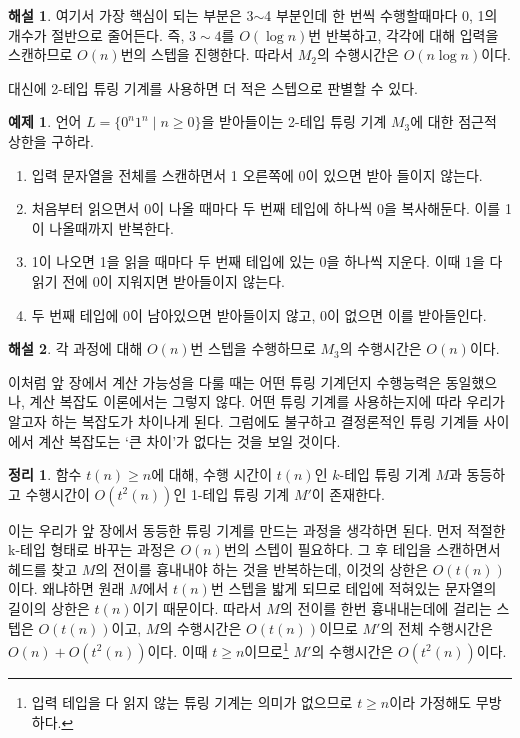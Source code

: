 \documentclass[b5paper, 11pt]{book}
\theoremstyle{definition}
\newtheorem{thm}[defn]{정리}
\newtheorem{ex}[defn]{예제}
\newtheorem*{ans*}{해설}
\newenvironment{pf*}{\pushQED{\qed}\pf}
{\popQED\endpf}
\begin{document}
\begin{ans*}
여기서 가장 핵심이 되는 부분은 3$\sim$4 부분인데 한 번씩 수행할때마다 0, 1의 개수가 절반으로 줄어든다. 즉, $3\sim 4$를 $O(\log{n})$번 반복하고, 각각에 대해 입력을 스캔하므로 $O(n)$번의 스텝을 진행한다. 따라서 $M_2$의 수행시간은 $O(n\log{n})$이다. 
\end{ans*} 
대신에 2-테입 튜링 기계를 사용하면 더 적은 스텝으로 판별할 수 있다. 
\begin{ex}
    언어 $L= \{0^n1^n \;\vert\; n \ge 0\}$을 받아들이는 2-테입 튜링 기계 $M_3$에 대한 점근적 상한을 구하라.
    \begin{enumerate}
        \item 입력 문자열을 전체를 스캔하면서 1 오른쪽에 0이 있으면 받아 들이지 않는다. 
        \item 처음부터 읽으면서 0이 나올 때마다 두 번째 테입에 하나씩 0을 복사해둔다.
        이를 1이 나올때까지 반복한다. 
        \item 1이 나오면 1을 읽을 때마다 두 번째 테입에 있는 0을 하나씩 지운다. 이때 1을 다 읽기 전에 0이 지워지면 받아들이지 않는다.
        \item 두 번째 테입에 0이 남아있으면 받아들이지 않고, 0이 없으면 이를 받아들인다. 
    \end{enumerate}
\end{ex}
\begin{ans*}
    각 과정에 대해 $O(n)$번 스텝을 수행하므로 $M_3$의 수행시간은 $O(n)$이다. 
\end{ans*}
이처럼 앞 장에서 계산 가능성을 다룰 때는 어떤 튜링 기계던지 수행능력은 동일했으나, 계산 복잡도 이론에서는 그렇지 않다. 어떤 튜링 기계를 사용하는지에 따라 우리가 알고자 하는 복잡도가 차이나게 된다. 그럼에도 불구하고 결정론적인 튜링 기계들 사이에서 계산 복잡도는 `큰 차이'가 없다는 것을 보일 것이다. 
\begin{thm} \label{t^2(n)}
    함수 $t(n) \ge n$에 대해, 수행 시간이 $t(n)$인 $k$-테입 튜링 기계 $M$과 동등하고 수행시간이 $O\left(t^2(n)\right)$인 1-테입 튜링 기계 $M'$이 존재한다. 
\end{thm}
\begin{pf*}
    이는 우리가 앞 장에서 동등한 튜링 기계를 만드는 과정을 생각하면 된다. 먼저 적절한 k-테입 형태로 바꾸는 과정은 $O(n)$번의 스텝이 필요하다. 그 후 테입을 스캔하면서 헤드를 찾고 $M$의 전이를 흉내내야 하는 것을 반복하는데, 이것의 상한은 $O(t(n))$이다. 왜냐하면 원래 $M$에서 $t(n)$번 스텝을 밟게 되므로 테입에 적혀있는 문자열의 길이의 상한은 $t(n)$이기 때문이다. 따라서 $M$의 전이를 한번 흉내내는데에 걸리는 스텝은 $O(t(n))$이고, $M$의 수행시간은 $O(t(n))$이므로 $M'$의 전체 수행시간은 $O(n) + O(t^2(n))$이다. 이때 $t \ge n$이므로\footnote{입력 테입을 다 읽지 않는 튜링 기계는 의미가 없으므로 $t\ge n$이라 가정해도 무방하다.} $M'$의  수행시간은 $O(t^2(n))$이다.
\end{pf*}
\end{document}
